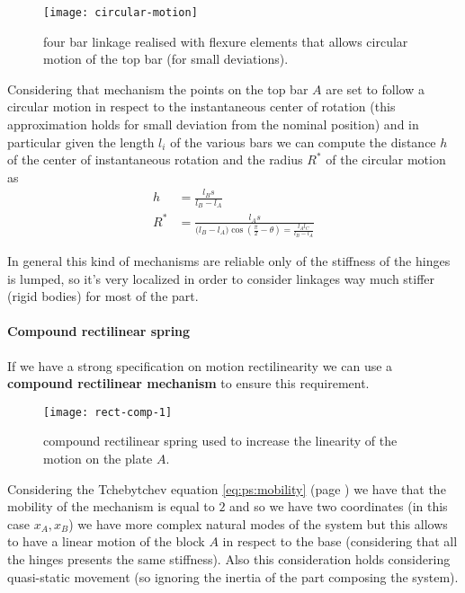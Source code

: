 		\begin{SCfigure}[2][bht]
			\centering
			\texttt{[image: circular-motion]}
			\caption{four bar linkage realised with flexure elements that allows circular motion of the top bar (for small deviations).}
			\label{fig:ps:circmotion}
		\end{SCfigure}
		
		Considering that mechanism the points on the top bar $A$ are set to follow a circular motion in respect to the instantaneous center of rotation (this approximation holds for small deviation from the nominal position) and in particular given the length $l_i$ of the various bars we can compute the distance $h$ of the center of instantaneous rotation and the radius $R^*$ of the circular motion as
		\begin{align*}
			h & = \frac{l_B s}{l_B-l_A} \\
			R^* & = \frac{l_As}{\big(l_B-l_A\big) \cos\left(\frac \pi 2 -\theta\right) = \frac{l_Al_C}{l_B-l_A} }
		\end{align*}
	
		In general this kind of mechanisms are reliable only of the stiffness of the hinges is lumped, so it's very localized in order to consider linkages way much stiffer (rigid bodies) for most of the part.
		
		\paragraph{Compound rectilinear spring} If we have a strong specification on motion rectilinearity we can use a \textbf{compound rectilinear mechanism} to ensure this requirement.
		
		\begin{SCfigure}[2][bht]
			\centering
			\texttt{[image: rect-comp-1]}
			\caption{compound rectilinear spring used to increase the linearity of the motion on the plate $A$.}
			\label{fig:ps:rect:comp}
		\end{SCfigure}
		
		Considering the Tchebytchev equation \ref{eq:ps:mobility} (page \pageref{eq:ps:mobility}) we have that the mobility of the mechanism is equal to $2$ and so we have two coordinates (in this case $x_A,x_B$) we have more complex natural modes of the system but this allows to have a linear motion of the block $A$ in respect to the base (considering that all the hinges presents the same stiffness). Also this consideration holds considering quasi-static movement (so ignoring the inertia of the part composing the system).
		
